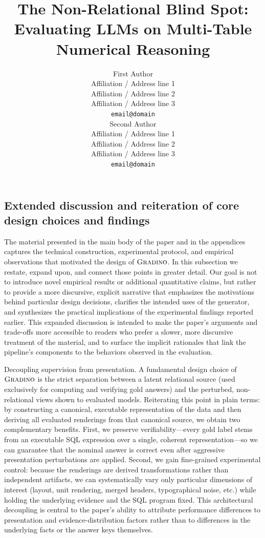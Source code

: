\documentclass[11pt]{article}
\title{The Non-Relational Blind Spot:\\ Evaluating LLMs on Multi-Table Numerical Reasoning}
\author{First Author \\
  Affiliation / Address line 1 \\
  Affiliation / Address line 2 \\
  Affiliation / Address line 3 \\
  \texttt{email@domain} \\\And
  Second Author \\
  Affiliation / Address line 1 \\
  Affiliation / Address line 2 \\
  Affiliation / Address line 3 \\
  \texttt{email@domain} \\}
\newcommand{\name}{$\textsc{Gradino}$\xspace}
\begin{document}
\maketitle



%









%



\subsection{Extended discussion and reiteration of core design choices and findings}
The material presented in the main body of the paper and in the appendices captures the technical construction, experimental protocol, and empirical observations that motivated the design of \name{}. In this subsection we restate, expand upon, and connect those points in greater detail. Our goal is not to introduce novel empirical results or additional quantitative claims, but rather to provide a more discursive, explicit narrative that emphasizes the motivations behind particular design decisions, clarifies the intended uses of the generator, and synthesizes the practical implications of the experimental findings reported earlier. This expanded discussion is intended to make the paper's arguments and trade-offs more accessible to readers who prefer a slower, more discursive treatment of the material, and to surface the implicit rationales that link the pipeline's components to the behaviors observed in the evaluation.

Decoupling supervision from presentation. A fundamental design choice of \name{} is the strict separation between a latent relational source (used exclusively for computing and verifying gold answers) and the perturbed, non-relational views shown to evaluated models. Reiterating this point in plain terms: by constructing a canonical, executable representation of the data and then deriving all evaluated renderings from that canonical source, we obtain two complementary benefits. First, we preserve verifiability—every gold label stems from an executable SQL expression over a single, coherent representation—so we can guarantee that the nominal answer is correct even after aggressive presentation perturbations are applied. Second, we gain fine-grained experimental control: because the renderings are derived transformations rather than independent artifacts, we can systematically vary only particular dimensions of interest (layout, unit rendering, merged headers, typographical noise, etc.) while holding the underlying evidence and the SQL program fixed. This architectural decoupling is central to the paper's ability to attribute performance differences to presentation and evidence-distribution factors rather than to differences in the underlying facts or the answer keys themselves.
\end{document}
